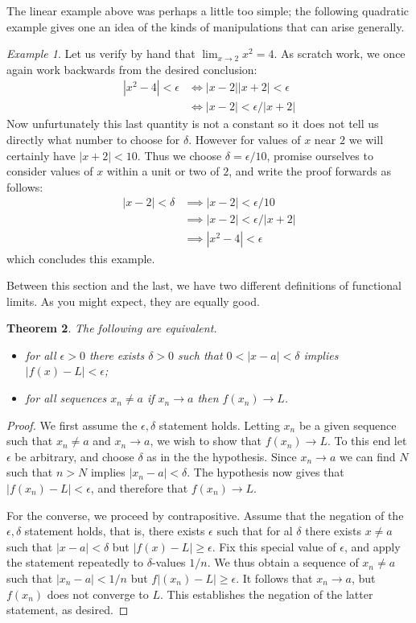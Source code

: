 \documentclass[11pt,oneside]{amsbook}
\theoremstyle{definition}
\theoremstyle{plain}
\newtheorem{thm}{Theorem}[section]
\theoremstyle{definition}
\theoremstyle{remark}
\newtheorem{example}[thm]{Example}
\numberwithin{equation}{section}
\numberwithin{figure}{section}
\begin{document}
The linear example above was perhaps a little too simple; the following quadratic example gives one an idea of the kinds of manipulations that can arise generally.

\begin{example}
  Let us verify by hand that $\lim_{x\to2}x^2=4$. As scratch work, we once again work backwards from the desired conclusion:
  \begin{align*}
    |x^2-4|<\epsilon&\iff |x-2||x+2|<\epsilon\\
                    &\iff |x-2|<\epsilon/|x+2|
  \end{align*}
  Now unfurtunately this last quantity is not a constant so it does not tell us directly what number to choose for $\delta$. However for values of $x$ near $2$ we will certainly have $|x+2|<10$. Thus we choose $\delta=\epsilon/10$, promise ourselves to consider values of $x$ within a unit or two of $2$, and write the proof forwards as follows:
  \begin{align*}
    |x-2|<\delta &\implies |x-2|<\epsilon/10\\
                 &\implies |x-2|<\epsilon/|x+2|\\
                 &\implies |x^2-4|<\epsilon
  \end{align*}
  which concludes this example.
\end{example}

Between this section and the last, we have two different definitions of functional limits. As you might expect, they are equally good.

\begin{thm}
  The following are equivalent.
  \begin{itemize}
  \item for all $\epsilon>0$ there exists $\delta>0$ such that $0<|x-a|<\delta$ implies $|f(x)-L|<\epsilon$;
  \item for all sequences $x_n\neq a$ if $x_n\to a$ then $f(x_n)\to L$.
  \end{itemize}
\end{thm}

\begin{proof}
  We first assume the $\epsilon,\delta$ statement holds. Letting $x_n$ be a given sequence such that $x_n\neq a$ and $x_n\to a$, we wish to show that $f(x_n)\to L$. To this end let $\epsilon$ be arbitrary, and choose $\delta$ as in the the hypothesis. Since $x_n\to a$ we can find $N$ such that $n>N$ implies $|x_n-a|<\delta$. The hypothesis now gives that $|f(x_n)-L|<\epsilon$, and therefore that $f(x_n)\to L$.

  For the converse, we proceed by contrapositive. Assume that the negation of the $\epsilon,\delta$ statement holds, that is, there exists $\epsilon$ such that for al $\delta$ there exists $x\neq a$ such that $|x-a|<\delta$ but $|f(x)-L|\geq\epsilon$. Fix this special value of $\epsilon$, and apply the statement repeatedly to $\delta$-values $1/n$. We thus obtain a sequence of $x_n\neq a$ such that $|x_n-a|<1/n$ but $f|(x_n)-L|\geq\epsilon$. It follows that $x_n\to a$, but $f(x_n)$ does not converge to $L$. This establishes the negation of the latter statement, as desired.
\end{proof}  
\end{document}
